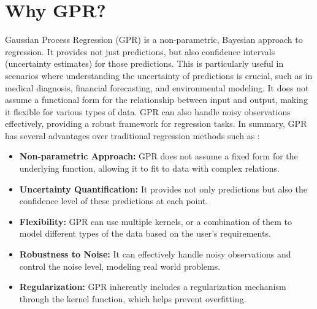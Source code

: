 \documentclass{article}
\begin{document}
\section{Why GPR?}
\label{sec:why_gpr}
Gaussian Process Regression (GPR) is a non-parametric, Bayesian approach to regression. It provides not just predictions, but also confidence intervals (uncertainty estimates) for those predictions. This is particularly useful in scenarios where understanding the uncertainty of predictions is crucial, such as in medical diagnosis, financial forecasting, and environmental modeling. It does not assume a functional form for the relationship between input and output, making it flexible for various types of data. GPR can also handle noisy observations effectively, providing a robust framework for regression tasks. In summary, GPR has several advantages over traditional regression methods such as :
\begin{itemize}
    \item \textbf{Non-parametric Approach:} GPR does not assume a fixed form for the underlying function, allowing it to fit to data with complex relations.
    \item \textbf{Uncertainty Quantification:} It provides not only predictions but also the confidence level of these predictions at each point.
    \item \textbf{Flexibility:} GPR can use multiple kernels, or a combination of them to model different types of the data based on the user's requirements.
    \item \textbf{Robustness to Noise:} It can effectively handle noisy observations and control the noise level, modeling real world problems.
    \item \textbf{Regularization:} GPR inherently includes a regularization mechanism through the kernel function, which helps prevent overfitting.
\end{itemize}
\end{document}
